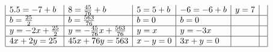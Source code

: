 \begin{solution}
$$\begin{array}{|l|l|l|l|l|l|}
5.5=-7+b                                                            & 8=\frac{45}{76}+b                                              & 5=5+b                                                         & -6=-6+b                                                          & y = 7                                                        &                                                                   \\ \hline
b=\frac{25}{2}                                                   & b=\frac{563}{76}                                               & b=0                                                           & b=0                                                              &                                                              &                                                                   \\ \hline
y=-2x+\frac{25}{2}                                               & y=-\frac{45}{76}x+\frac{563}{76}                            & y=x                                                           & y=-3x                                                            &                                                              &                                                                   \\ \hline
4x+2y=25                                                            & 45x+76y=563                                                       & x-y=0                                                         & 3x+y=0                                                           &                                                              &                                                                   \\ \hline
\end{array}
$$
\end{solution}

